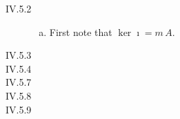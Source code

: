 \begin{description}
\item[IV.5.2]
\begin{enumerate}[(a)]
\item First note that $\ker \imath = m\,A$.
\end{enumerate}
\item[IV.5.3]
\item[IV.5.4]
\item[IV.5.7]
\item[IV.5.8]
\item[IV.5.9]
\end{description}
